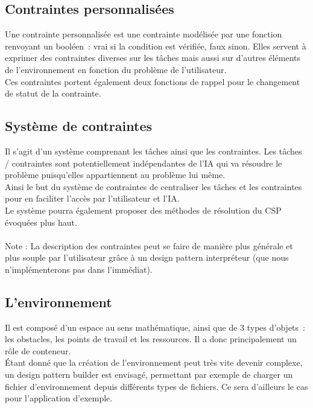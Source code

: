 \subsection{Contraintes personnalisées}

Une contrainte personnalisée est une contrainte modélisée par une fonction renvoyant un booléen~: vrai si la condition est vérifiée, faux sinon.
Elles servent à exprimer des contraintes diverses sur les tâches mais aussi sur d'autres éléments de l'environnement en fonction du problème de l'utilisateur.\\

Ces contraintes portent également deux fonctions de rappel pour le changement de statut de la contrainte.

\subsection{Système de contraintes}
Il s'agit d'un système comprenant les tâches ainsi que les contraintes. Les  tâches / contraintes sont potentiellement indépendantes de l'IA qui va résoudre le problème puisqu'elles appartiennent au problème lui même.\\

Ainsi le but du système de contraintes de centraliser les tâches et les contraintes pour en faciliter l'accès par l'utilisateur et l'IA.\\
\indent Le système pourra également proposer des méthodes de résolution du CSP évoquées plus haut.\\\\

Note : La description des contraintes peut se faire de manière plus générale et plus souple par l'utilisateur grâce à un design pattern interpréteur (que nous n'implémenterons pas dans l'immédiat).


\subsection{L'environnement}

Il est composé d'un espace au sens mathématique, ainsi que de 3 types d'objets~: les obstacles, les points de travail et les ressources. Il a donc principalement un rôle de conteneur.\\

\'Etant donné que la création de l'environnement peut très vite devenir complexe, un design pattern builder est envisagé, permettant par exemple de charger un fichier d'environnement depuis différents types de fichiers.
Ce sera d'ailleurs le cas pour l'application d'exemple.\\\\

